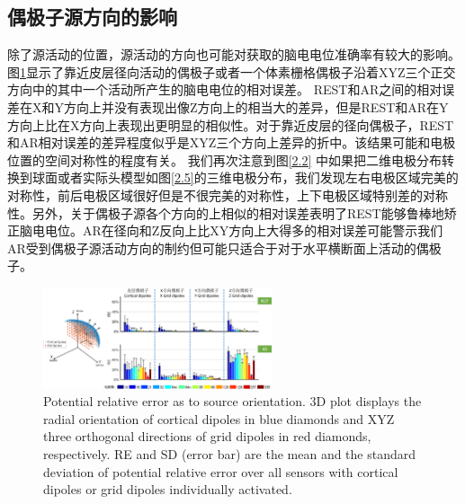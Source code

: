 \subsection{偶极子源方向的影响}
除了源活动的位置，源活动的方向也可能对获取的脑电电位准确率有较大的影响。图\ref{2.7}显示了靠近皮层径向活动的偶极子或者一个体素栅格偶极子沿着XYZ三个正交方向中的其中一个活动所产生的脑电电位的相对误差。 REST和AR之间的相对误差在X和Y方向上并没有表现出像Z方向上的相当大的差异，但是REST和AR在Y方向上比在X方向上表现出更明显的相似性。对于靠近皮层的径向偶极子，REST和AR相对误差的差异程度似乎是XYZ三个方向上差异的折中。该结果可能和电极位置的空间对称性的程度有关。 我们再次注意到图\ref{2.2}
中如果把二维电极分布转换到球面或者实际头模型如图\ref{2.5}的三维电极分布，我们发现左右电极区域完美的对称性，前后电极区域很好但是不很完美的对称性，上下电极区域特别差的对称性。另外，关于偶极子源各个方向的上相似的相对误差表明了REST能够鲁棒地矫正脑电电位。AR在径向和Z反向上比XY方向上大得多的相对误差可能警示我们AR受到偶极子源活动方向的制约但可能只适合于对于水平横断面上活动的偶极子。
\begin{figure}[h!]
	\centering
	\includegraphics[width=0.6\textwidth,natwidth=610,natheight=642]{pic/JNE/figure7.png}
	\caption{Potential relative error as to source orientation. 3D plot displays the radial orientation of cortical dipoles in blue diamonds and XYZ three orthogonal directions of grid dipoles in red diamonds, respectively. RE and SD (error bar) are the mean and the standard deviation of potential relative error over all sensors with cortical dipoles or grid dipoles individually activated.}
	\label{2.7}
\end{figure}


